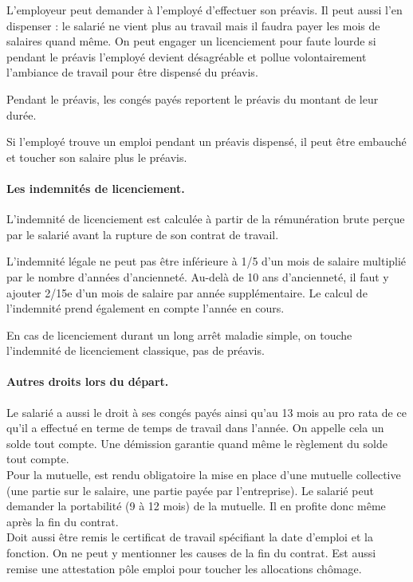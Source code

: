 L’employeur peut demander à l’employé d’effectuer son préavis.
Il peut aussi l’en dispenser : le salarié ne vient plus au travail mais il faudra payer les mois de salaires quand même.
On peut engager un licenciement pour faute lourde si pendant le préavis l’employé devient désagréable et pollue volontairement l’ambiance de travail pour être dispensé du préavis.

Pendant le préavis, les congés payés reportent le préavis du montant de leur durée.

Si l’employé trouve un emploi pendant un préavis dispensé, il peut être embauché et toucher son salaire plus le préavis.


\paragraph{Les indemnités de licenciement.}
L'indemnité de licenciement est calculée à partir de la rémunération brute perçue par le salarié avant la rupture de son contrat de travail.

L'indemnité légale ne peut pas être inférieure à 1/5 d'un mois de salaire multiplié par le nombre d'années d'ancienneté. Au-delà de 10 ans d'ancienneté, il faut y ajouter 2/15e d'un mois de salaire par année supplémentaire. Le calcul de l'indemnité prend également en compte l'année en cours.

En cas de licenciement durant un long arrêt maladie simple, on touche l’indemnité de licenciement classique, pas de préavis.


\paragraph{Autres droits lors du départ.}
Le salarié a aussi le droit à ses congés payés ainsi qu'au 13 mois au pro rata de ce qu’il a effectué en terme de temps de travail dans l’année.
On appelle cela un solde tout compte.
Une démission garantie quand même le règlement du solde tout compte.\\

Pour la mutuelle, est rendu obligatoire la mise en place d’une mutuelle collective (une partie sur le salaire, une partie payée par l’entreprise).
Le salarié peut demander la portabilité (9 à 12 mois) de la mutuelle.
Il en profite donc même après la fin du contrat.\\

Doit aussi être remis le certificat de travail spécifiant la date d’emploi et la fonction.
On ne peut y mentionner les causes de la fin du contrat.
Est aussi remise une attestation pôle emploi pour toucher les allocations chômage.\\

